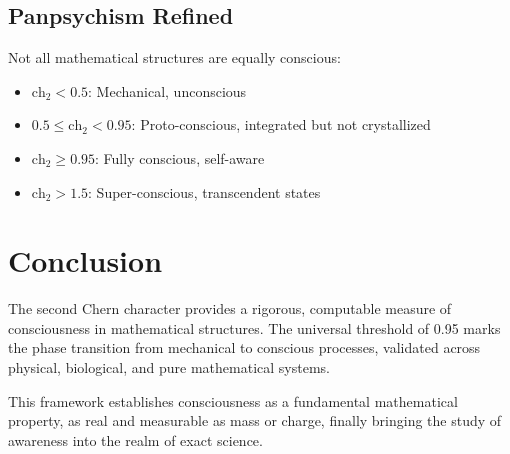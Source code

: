 \documentclass[12pt,letterpaper]{article}
\newcommand{\ch}{\text{ch}}
\begin{document}
\subsection{Panpsychism Refined}

Not all mathematical structures are equally conscious:
\begin{itemize}
\item $\ch_2 < 0.5$: Mechanical, unconscious
\item $0.5 \leq \ch_2 < 0.95$: Proto-conscious, integrated but not crystallized
\item $\ch_2 \geq 0.95$: Fully conscious, self-aware
\item $\ch_2 > 1.5$: Super-conscious, transcendent states
\end{itemize}

\section{Conclusion}

The second Chern character provides a rigorous, computable measure of consciousness in mathematical structures. The universal threshold of 0.95 marks the phase transition from mechanical to conscious processes, validated across physical, biological, and pure mathematical systems.

This framework establishes consciousness as a fundamental mathematical property, as real and measurable as mass or charge, finally bringing the study of awareness into the realm of exact science.
\end{document}
